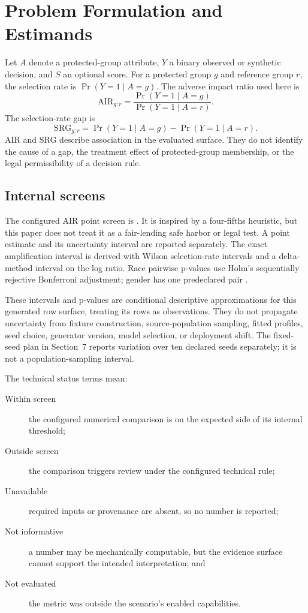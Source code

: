 \section{Problem Formulation and Estimands}

Let $A$ denote a protected-group attribute, $Y$ a binary observed or synthetic decision, and
$S$ an optional score. For a protected group $g$ and reference group $r$, the selection rate is
$\Pr(Y=1\mid A=g)$. The adverse impact ratio used here is
\begin{equation}
  \mathrm{AIR}_{g:r}=\frac{\Pr(Y=1\mid A=g)}{\Pr(Y=1\mid A=r)}.
\end{equation}
The selection-rate gap is
\begin{equation}
  \mathrm{SRG}_{g:r}=\Pr(Y=1\mid A=g)-\Pr(Y=1\mid A=r).
\end{equation}
AIR and SRG describe association in the evaluated surface. They do not identify the cause of a gap,
the treatment effect of protected-group membership, or the legal permissibility of a decision rule.

\subsection{Internal screens}

The configured AIR point screen is \AIRThreshold{}. It is inspired by a four-fifths heuristic, but
this paper does not treat it as a fair-lending safe harbor or legal test. A point estimate and its
uncertainty interval are reported separately. The exact amplification interval is derived with
Wilson selection-rate intervals and a delta-method interval on the log ratio. Race pairwise
p-values use Holm's sequentially rejective Bonferroni adjustment; gender has one predeclared pair
\citep{wilson1927probable,oehlert1992delta,holm1979sequential}.

These intervals and p-values are conditional descriptive approximations for this generated row
surface, treating its rows as observations. They do not propagate uncertainty from fixture
construction, source-population sampling, fitted profiles, seed choice, generator version, model
selection, or deployment shift. The fixed-seed plan in Section~7 reports variation over ten
declared seeds separately; it is not a population-sampling interval.

The technical status terms mean:

\begin{description}
  \item[Within screen] the configured numerical comparison is on the expected side of its internal
    threshold;
  \item[Outside screen] the comparison triggers review under the configured technical rule;
  \item[Unavailable] required inputs or provenance are absent, so no number is reported;
  \item[Not informative] a number may be mechanically computable, but the evidence surface cannot
    support the intended interpretation; and
  \item[Not evaluated] the metric was outside the scenario's enabled capabilities.
\end{description}

